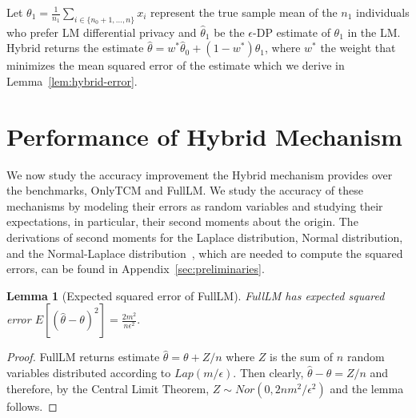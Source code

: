 \documentclass{article}
\theoremstyle{plain}
\newtheorem{lem}[thm]{Lemma}
\begin{document}
Let $\theta_1 = \frac{1}{n_1}\sum_{i \in \{n_0+1, \dots, n\}} x_i$ represent the true sample mean of the $n_1$ individuals who prefer LM differential privacy and $\hat{\theta}_1$ be the $\epsilon$-DP estimate of $\theta_1$ in the LM. %
Hybrid returns the estimate $\hat{\theta} = w^*\hat{\theta}_0 + (1-w^*)\hat{\theta}_1$, where $w^*$ the weight that minimizes the mean squared error of the estimate which we derive in Lemma~\ref{lem:hybrid-error}.





\section{Performance of Hybrid Mechanism}\label{sec:performance}
We now study the accuracy improvement the Hybrid mechanism provides over the benchmarks, OnlyTCM and FullLM. We study the accuracy of these mechanisms by modeling their errors as random variables and studying their expectations, in particular, their second moments about the origin. The derivations of second moments for the Laplace distribution, Normal distribution, and the Normal-Laplace distribution~\cite{Reed2006}, which are needed to compute the squared errors, can be found in Appendix~\ref{sec:preliminaries}.

\begin{lem}[Expected squared error of FullLM]
\label{MSE_FullLM}
FullLM has expected squared error
$E[(\hat{\theta} - \theta)^2] = \frac{2m^2}{n\epsilon^2}.$
\end{lem}
\begin{proof}
FullLM returns estimate $\hat{\theta} = \theta + Z/n$ where $Z$ is the sum of $n$ random variables distributed according to $Lap(m/\epsilon)$. Then clearly, $\hat{\theta} - \theta = Z/n$ and therefore, by the Central Limit Theorem, $Z \sim Nor(0, 2nm^2/\epsilon^2)$ and the lemma follows. 
\end{proof}
\end{document}
